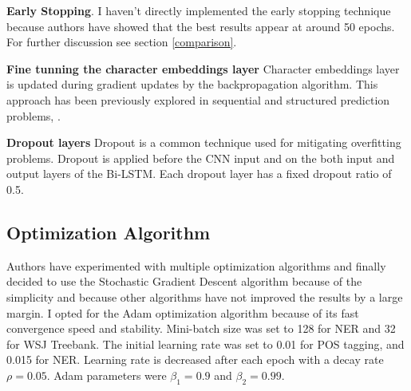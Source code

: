 \textbf{Early Stopping}. I haven't directly implemented the early stopping
technique\cite{caruana2000overfitting} because authors have showed that the best results
appear at around 50 epochs. For further discussion see section
\ref{comparison}.

\textbf{Fine tunning the character embeddings layer}
Character embeddings layer is updated during gradient updates by the
backpropagation algorithm. This approach has been previously explored in
sequential and structured prediction problems\cite{collobert2011natural},
\cite{peng2015named}.

\textbf{Dropout layers}
Dropout is a common technique used for mitigating overfitting problems.
Dropout is applied before the CNN input and on the both input and output
layers of the Bi-LSTM. Each dropout layer has a fixed dropout ratio of 0.5.

\subsection{Optimization Algorithm}
Authors have experimented with multiple optimization algorithms and finally
decided to use the Stochastic Gradient Descent algorithm because of
the simplicity and because other algorithms have not improved the results by a
large margin. I opted for the Adam optimization algorithm\cite{kingma2014adam} because of
its fast convergence speed and stability. Mini-batch size was set to 128 for
NER and 32 for WSJ Treebank. The initial learning rate was set to 0.01 for
POS tagging, and 0.015 for NER. Learning rate is decreased after each epoch
with a decay rate $\rho = 0.05$. Adam parameters were $\beta_1 = 0.9$ and
$\beta_2 = 0.99$.

